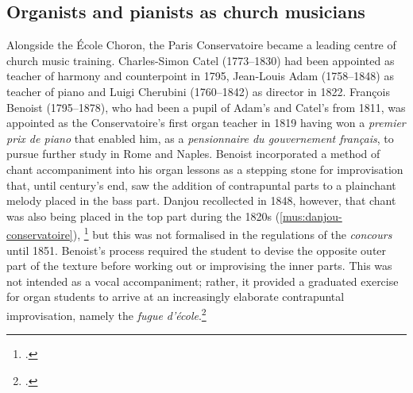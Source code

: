 \subsection{Organists and pianists as church musicians}
Alongside the École Choron, the Paris Conservatoire became a leading centre of church music training.
Charles-Simon Catel (1773--1830) had been appointed as teacher of harmony and counterpoint in 1795, Jean-Louis Adam (1758--1848) as teacher of piano and Luigi Cherubini (1760--1842) as director in 1822.
François Benoist (1795--1878), who had been a pupil of Adam's and Catel's from 1811, was appointed as the Conservatoire's first organ teacher in 1819 having won a \emph{premier prix de piano} that enabled him, as a \textit{pensionnaire du gouvernement français}, to pursue further study in Rome and Naples.
Benoist incorporated a method of chant accompaniment into his organ lessons as a stepping stone for improvisation that, until century's end, saw the addition of contrapuntal parts to a plainchant melody placed in the bass part.
%
Danjou recollected in 1848, however, that chant was also being placed in the top part during the 1820s (\cref{mus:danjou-conservatoire}), \footcite[11]{Danjouaccompagnementplainchant1848} but this was not formalised in the regulations of the \emph{concours} until 1851.
Benoist's process required the student to devise the opposite outer part of the texture before working out or improvising the inner parts.
This was not intended as a vocal accompaniment; rather, it provided a graduated exercise for organ students to arrive at an increasingly elaborate contrapuntal improvisation, namely the \emph{fugue d'école}.\footcite[82]{JuttenEvolutionenseignementimprovisation1999}

